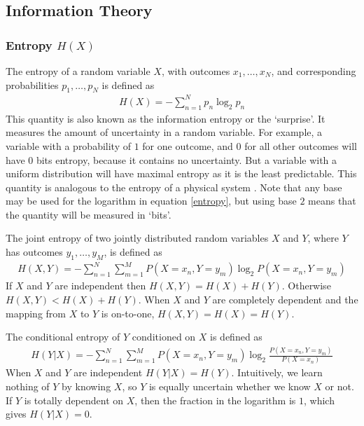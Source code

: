     \subsection{Information Theory}\label{sec:information_theory}
        \subsubsection{Entropy $H(X)$}
        The entropy of a random variable $X$, with outcomes $x_1, \dots, x_N$, and corresponding probabilities $p_1, \dots, p_N$ is defined as
        \begin{align}\label{entropy}
        H(X) = -\sum_{n=1}^N p_n \log _2 p_n
        \end{align}
        This quantity is also known as the information entropy or the `surprise'. It measures the amount of uncertainty in a random variable. For example, a variable with a probability of $1$ for one outcome, and $0$ for all other outcomes will have 0 bits entropy, because it contains no uncertainty. But a variable with a uniform distribution will have maximal entropy as it is the least predictable. This quantity is analogous to the entropy of a physical system  \parencite{shannon}. Note that any base may be used for the logarithm in equation \ref{entropy}, but using base $2$ means that the quantity will be measured in `bits'.

        The joint entropy of two jointly distributed random variables $X$ and $Y$, where $Y$ has outcomes $y_1, \dots, y_M$, is defined as
        \begin{align}\label{joint_entropy}
        H(X, Y) = -\sum_{n=1}^N \sum_{m=1}^M P(X=x_n, Y=y_m) \log _2 P(X=x_n, Y=y_m)
        \end{align}
        If $X$ and $Y$ are independent then $H(X,Y) = H(X) + H(Y)$. Otherwise $H(X,Y) < H(X) + H(Y)$. When $X$ and $Y$ are completely dependent and the mapping from $X$ to $Y$ is on-to-one, $H(X,Y) = H(X) = H(Y)$.

        The conditional entropy of $Y$ conditioned on $X$ is defined as
        \begin{align}
        H(Y|X) = -\sum_{n=1}^N \sum_{m=1}^M P(X=x_n, Y=y_m) \log _2 \frac{P(X=x_n, Y=y_m)}{P(X=x_n)}
        \end{align}
        When $X$ and $Y$ are independent $H(Y|X) = H(Y)$. Intuitively, we learn nothing of $Y$ by knowing $X$, so $Y$ is equally uncertain whether we know $X$ or not. If $Y$ is totally dependent on $X$, then the fraction in the logarithm is $1$, which gives $H(Y|X) = 0$.

